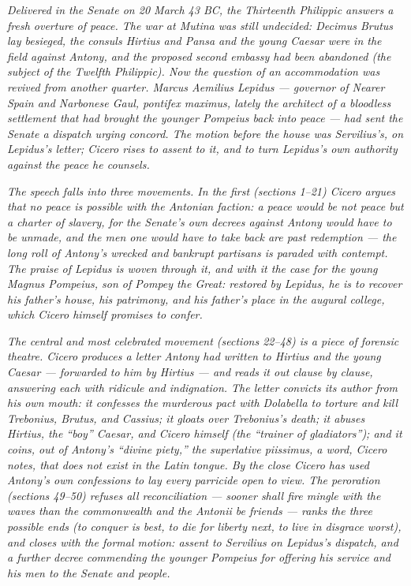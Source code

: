 
\textit{Delivered in the Senate on 20 March 43 BC, the Thirteenth
Philippic answers a fresh overture of peace. The war at Mutina was
still undecided: Decimus Brutus lay besieged, the consuls Hirtius and
Pansa and the young Caesar were in the field against Antony, and the
proposed second embassy had been abandoned (the subject of the Twelfth
Philippic). Now the question of an accommodation was revived from
another quarter. Marcus Aemilius Lepidus --- governor of Nearer Spain
and Narbonese Gaul, pontifex maximus, lately the architect of a
bloodless settlement that had brought the younger Pompeius back into
peace --- had sent the Senate a dispatch urging concord. The motion
before the house was Servilius's, on Lepidus's letter; Cicero rises to
assent to it, and to turn Lepidus's own authority against the peace he
counsels.}

\textit{The speech falls into three movements. In the first (sections
1--21) Cicero argues that no peace is possible with the Antonian
faction: a peace would be not peace but a charter of slavery, for the
Senate's own decrees against Antony would have to be unmade, and the
men one would have to take back are past redemption --- the long roll
of Antony's wrecked and bankrupt partisans is paraded with contempt.
The praise of Lepidus is woven through it, and with it the case for
the young Magnus Pompeius, son of Pompey the Great: restored by
Lepidus, he is to recover his father's house, his patrimony, and his
father's place in the augural college, which Cicero himself promises
to confer.}

\textit{The central and most celebrated movement (sections 22--48) is
a piece of forensic theatre. Cicero produces a letter Antony had
written to Hirtius and the young Caesar --- forwarded to him by
Hirtius --- and reads it out clause by clause, answering each with
ridicule and indignation. The letter convicts its author from his own
mouth: it confesses the murderous pact with Dolabella to torture and
kill Trebonius, Brutus, and Cassius; it gloats over Trebonius's death;
it abuses Hirtius, the ``boy'' Caesar, and Cicero himself (the
``trainer of gladiators''); and it coins, out of Antony's ``divine
piety,'' the superlative \textit{piissimus}, a word, Cicero notes,
that does not exist in the Latin tongue. By the close Cicero has used
Antony's own confessions to lay every parricide open to view. The
peroration (sections 49--50) refuses all reconciliation --- sooner
shall fire mingle with the waves than the commonwealth and the Antonii
be friends --- ranks the three possible ends (to conquer is best, to
die for liberty next, to live in disgrace worst), and closes with the
formal motion: assent to Servilius on Lepidus's dispatch, and a
further decree commending the younger Pompeius for offering his
service and his men to the Senate and people.}
